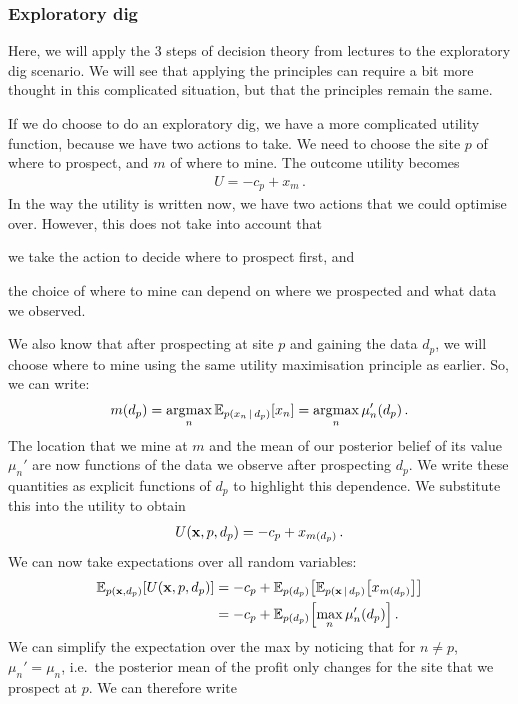 \documentclass[a4paper]{article}
\theoremstyle{definition}
\begin{document}
\subsubsection{Exploratory dig}
Here, we will apply the 3 steps of decision theory from lectures to the exploratory dig scenario. We will see that applying the principles can require a bit more thought in this complicated situation, but that the principles remain the same.

If we do choose to do an exploratory dig, we have a more complicated utility function, because we have two actions to take. We need to choose the site $p$ of where to prospect, and $m$ of where to mine. The outcome utility becomes
\begin{align}
U = -c_p + x_m \,.
\end{align}
In the way the utility is written now, we have two actions that we could optimise over. However, this does not take into account that
\begin{inparaenum}[1)]
\item we take the action to decide where to prospect first, and
\item the choice of where to mine can depend on where we prospected and what data we observed.
\end{inparaenum} We also know that after prospecting at site $p$ and gaining the data $d_p$, we will choose where to mine using the same utility maximisation principle as earlier. So, we can write:
\begin{align}
m(d_p) = \argmax_n \Exp{p(x_n\given d_p)}{x_n} = \argmax_n \mu_n'(d_p) \,. \label{eq:m-given-data}
\end{align}
The location that we mine at $m$ and the mean of our posterior belief of its value $\mu_n'$ are now functions of the data we observe after prospecting $d_p$. We write these quantities as explicit functions of $d_p$ to highlight this dependence. We substitute this into the utility to obtain
\begin{align}
U(\mathbf{x}, p, d_p) = -c_p + x_{m(d_p)} \,.
\end{align}
We can now take expectations over all random variables:
\begin{align}
\Exp{p(\vx, d_p)}{U(\vx, p, d_p)} &= -c_p + \Exp{p(d_p)}{\Exp{p(\vx\given d_p)}{x_{m(d_p)}}} \\
&= -c_p + \Exp{p(d_p)}{\max_n\mu_n'(d_p)} \,.
\end{align}
We can simplify the expectation over the max by noticing that for $n\neq p$, $\mu_n' = \mu_n$, i.e.~the posterior mean of the profit only changes for the site that we prospect at $p$. We can therefore write
\end{document}
